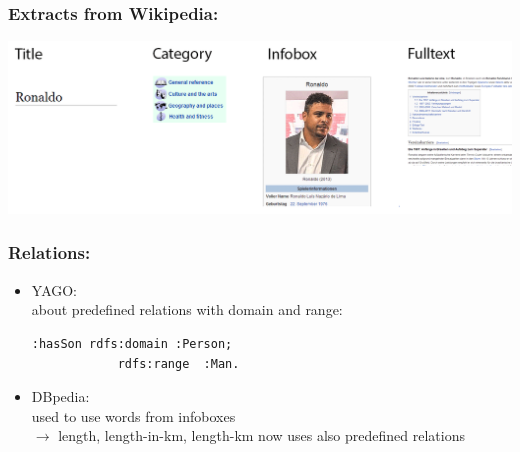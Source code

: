 \begin{frame}
\frametitle{Extracts from Wikipedia:}
\includegraphics[scale=0.25]{img/yago-figure3.png}
\end{frame}

\begin{frame}[fragile]
\frametitle{Relations:}
\begin{itemize}
\item YAGO:\\
about predefined relations with domain and range:\\
\begin{lstlisting}[frame=single]
:hasSon rdfs:domain :Person;
            rdfs:range  :Man.
\end{lstlisting}
\item DBpedia:\\
used to use words from infoboxes\\
$\rightarrow$ length, length-in-km, length-km
now uses also predefined relations
\end{itemize}
\end{frame}


